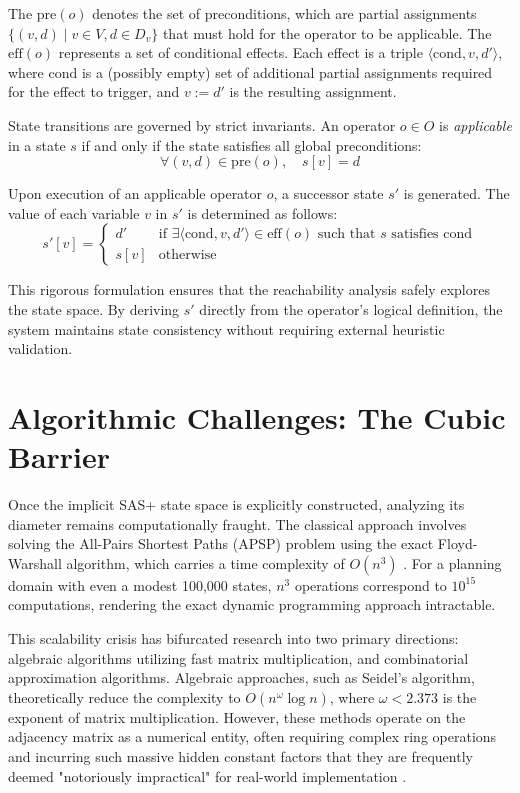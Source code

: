 The $\text{pre}(o)$ denotes the set of preconditions, which are partial assignments $\{(v, d) \mid v \in V, d \in D_v\}$ that must hold for the operator to be applicable. The $\text{eff}(o)$ represents a set of conditional effects. Each effect is a triple $\langle \text{cond}, v, d' \rangle$, where $\text{cond}$ is a (possibly empty) set of additional partial assignments required for the effect to trigger, and $v := d'$ is the resulting assignment.

State transitions are governed by strict invariants. An operator $o \in O$ is \textit{applicable} in a state $s$ if and only if the state satisfies all global preconditions:
$$ \forall (v, d) \in \text{pre}(o), \quad s[v] = d $$

Upon execution of an applicable operator $o$, a successor state $s'$ is generated. The value of each variable $v$ in $s'$ is determined as follows:
\begin{equation}
s'[v] = 
\begin{cases} 
d' & \text{if } \exists \langle \text{cond}, v, d' \rangle \in \text{eff}(o) \text{ such that } s \text{ satisfies } \text{cond} \\
s[v] & \text{otherwise}
\end{cases}
\end{equation}

This rigorous formulation ensures that the reachability analysis safely explores the state space. By deriving $s'$ directly from the operator's logical definition, the system maintains state consistency without requiring external heuristic validation.

\section{Algorithmic Challenges: The Cubic Barrier}
Once the implicit SAS+ state space is explicitly constructed, analyzing its diameter remains computationally fraught. The classical approach involves solving the All-Pairs Shortest Paths (APSP) problem using the exact Floyd-Warshall algorithm, which carries a time complexity of $O(n^3)$ \cite{ecealgo}. For a planning domain with even a modest 100,000 states, $n^3$ operations correspond to $10^{15}$ computations, rendering the exact dynamic programming approach intractable.

This scalability crisis has bifurcated research into two primary directions: algebraic algorithms utilizing fast matrix multiplication, and combinatorial approximation algorithms. Algebraic approaches, such as Seidel’s algorithm, theoretically reduce the complexity to $O(n^{\omega} \log n)$, where $\omega < 2.373$ is the exponent of matrix multiplication. However, these methods operate on the adjacency matrix as a numerical entity, often requiring complex ring operations and incurring such massive hidden constant factors that they are frequently deemed "notoriously impractical" for real-world implementation \cite{cmuSeidel}.

